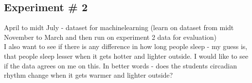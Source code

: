 \documentclass[12pt]{article} %
\begin{document}
\subsection{Experiment \# 2}
April to midt July - dataset for machinelearning (learn on dataset from midt November to March and then run on experiment 2 data for evaluation)\\

I also want to see if there is any difference in how long people sleep - my guess is, that people sleep lesser when it gets hotter and lighter outside. I would like to see if the data agrees on me on this. In better words - does the students circadian rhythm change when it gets warmer and lighter outside?






\end{document}
